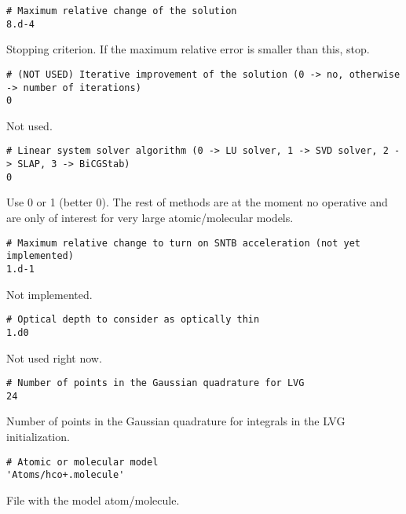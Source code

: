 \documentclass[12pt]{article}
\begin{document}
\begin{footnotesize} \begin{verbatim}
# Maximum relative change of the solution
8.d-4
\end{verbatim} \end{footnotesize}
Stopping criterion. If the maximum relative error is smaller than this, stop.

\begin{footnotesize} \begin{verbatim}
# (NOT USED) Iterative improvement of the solution (0 -> no, otherwise -> number of iterations)
0
\end{verbatim} \end{footnotesize}
Not used.

\begin{footnotesize} \begin{verbatim}
# Linear system solver algorithm (0 -> LU solver, 1 -> SVD solver, 2 -> SLAP, 3 -> BiCGStab)
0
\end{verbatim} \end{footnotesize}
Use 0 or 1 (better 0). The rest of methods are at the moment no operative and
are only of interest for very large atomic/molecular models.

\begin{footnotesize} \begin{verbatim}
# Maximum relative change to turn on SNTB acceleration (not yet implemented)
1.d-1
\end{verbatim} \end{footnotesize}
Not implemented.

\begin{footnotesize} \begin{verbatim}
# Optical depth to consider as optically thin
1.d0
\end{verbatim} \end{footnotesize}
Not used right now.

\begin{footnotesize} \begin{verbatim}
# Number of points in the Gaussian quadrature for LVG
24
\end{verbatim} \end{footnotesize}
Number of points in the Gaussian quadrature for integrals in the LVG initialization.

\begin{footnotesize} \begin{verbatim}
# Atomic or molecular model
'Atoms/hco+.molecule'
\end{verbatim} \end{footnotesize}
File with the model atom/molecule.
\end{document}
